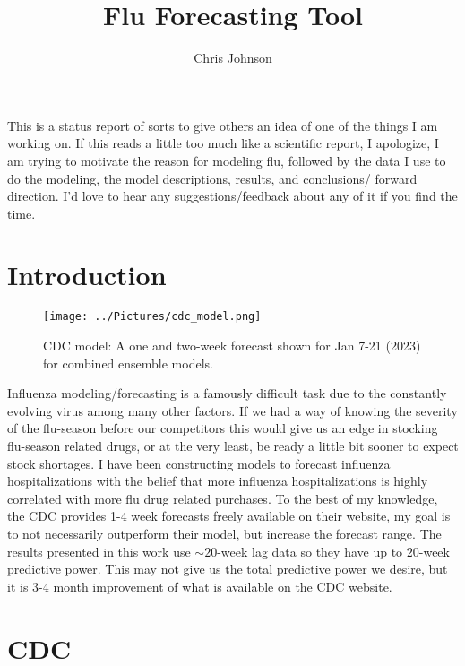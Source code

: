 \documentclass[12pt,a4paper,english]{article}
\begin{document}
\title{Flu Forecasting Tool}
\author{Chris Johnson}
\maketitle

This is a status report of sorts to give others an idea of one of the things I am working on. If this reads a little too much like a scientific report, I apologize, I am trying to motivate the reason for modeling flu, followed by the data I use to do the modeling, the model descriptions, results, and conclusions/ forward direction. I'd love to hear any suggestions/feedback about any of it if you find the time.

\section{Introduction}




\begin{figure}[h]
		\begin{center}
		\texttt{[image: ../Pictures/cdc\_model.png]}
		\caption{CDC model: A one and two-week forecast shown for Jan 7-21 (2023) for combined ensemble models.}
		\end{center}
		\label{fig:cdcc}
	\end{figure}

	
\FloatBarrier



Influenza modeling/forecasting is a famously difficult task due to the constantly evolving virus among many other factors. If we had a way of knowing the severity of the flu-season before our competitors this would give us an edge in stocking flu-season related drugs, or at the very least, be ready a little bit sooner to expect stock shortages. I have been constructing models to forecast influenza hospitalizations with the belief that more influenza hospitalizations is highly correlated with more flu drug related purchases. To the best of my knowledge, the CDC provides 1-4 week forecasts freely available on their website, my goal is to not necessarily outperform their model, but increase the forecast range. The results presented in this work use $\sim 20$-week lag data so they have up to $20$-week predictive power. This may not give us the total predictive power we desire, but it is 3-4 month improvement of what is available on the CDC website.



\section{CDC}
\end{document}
